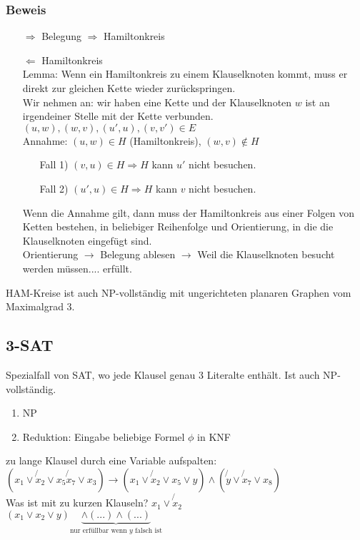 \subsubsection{Beweis}
\begin{enumerate}
\item[$\Rightarrow$] Belegung $\Rightarrow$ Hamiltonkreis \checkmark
\item[$\Leftarrow$] Hamiltonkreis\\
Lemma: Wenn ein Hamiltonkreis zu einem Klauselknoten kommt, muss er direkt zur gleichen Kette wieder zurückspringen.\\
Wir nehmen an: wir haben eine Kette und der Klauselknoten $w$ ist an irgendeiner Stelle mit der Kette verbunden. $(u,w), (w,v),(u',u), (v,v') \in E$\\
Annahme: $(u,w) \in H$ (Hamiltonkreis), $(w,v) \notin H$
\begin{enumerate}
\item[Fall 1)] $(v,u) \in H \Rightarrow H$ kann $u'$ nicht besuchen.
\item[Fall 2)] $(u',u) \in H \Rightarrow H$ kann $v$ nicht besuchen.
\end{enumerate}
Wenn die Annahme gilt, dann muss der Hamiltonkreis aus einer Folgen von Ketten bestehen, in beliebiger Reihenfolge und Orientierung, in die die Klauselknoten eingefügt sind.\\
Orientierung $\rightarrow$ Belegung ablesen $\rightarrow$ Weil die Klauselknoten besucht werden müssen.... erfüllt.\\
\end{enumerate}
HAM-Kreise ist auch NP-vollständig mit ungerichteten planaren Graphen vom Maximalgrad 3.\\
\subsection{3-SAT}
Spezialfall von SAT, wo jede Klausel genau 3 Literalte enthält. Ist auch NP-vollständig.\\
\begin{enumerate}
\item NP \checkmark
\item Reduktion: Eingabe beliebige Formel $\phi$ in KNF
\end{enumerate}
zu lange Klausel durch eine Variable aufspalten:\\
$(x_1 \lor \not{x}_2 \lor x_5 \not{x}_7 \lor x_3) \rightarrow (x_1 \lor \not{x}_2 \lor x_5 \lor y) \land (\not{y} \lor \not{x}_7 \lor x_8)$\\
Was ist mit zu kurzen Klauseln? $x_1 \lor \not{x}_2$\\
$(x_1 \lor x_2 \lor y) \underbrace{ \land (...) \land (...)}_{\text{nur erfüllbar wenn $y$ falsch ist}}$
